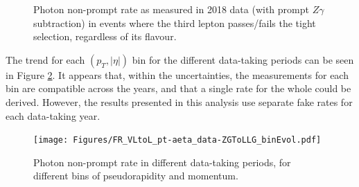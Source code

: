 \begin{figure}
%
\caption{Photon non-prompt rate as measured in 2018 data (with prompt $Z\gamma$ subtraction) in events where the third lepton passes/fails the tight selection, regardless of its flavour.}
\label{fig:phFR_PF}
\end{figure}

The trend for each $(p_{T}, |\eta|)$ bin for the different data-taking periods can be seen in Figure \ref{fig:phFR_time}.
It appears that, within the uncertainties, the measurements for each bin are compatible across the years,
and that a single rate for the whole  could be derived.
However, the results presented in this analysis use separate fake rates for each data-taking year.

\begin{figure}
\centering
\texttt{[image: Figures/FR\_VLtoL\_pt-aeta\_data-ZGToLLG\_binEvol.pdf]}
\caption{Photon non-prompt rate in different data-taking periods, for different bins of pseudorapidity and momentum.}
\label{fig:phFR_time}
\end{figure}

